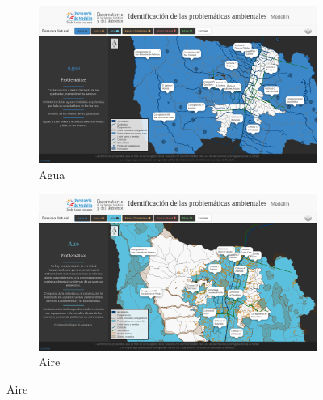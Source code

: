 \documentclass[11pt,letterpaper]{article}
\begin{document}
\begin{figure}[ht!]
\centering
\begin{subfigure}{.49\textwidth}
	\includegraphics[width=\textwidth]{../assets/images/recurso_natural/recurso_agua.png}
	\caption{Agua}\label{fig:rAgua}
\end{subfigure}	
\hfill
\begin{subfigure}{.49\textwidth}
	\includegraphics[width=\textwidth]{../assets/images/recurso_natural/recurso_aire.png}
	\caption{Aire}\label{fig:rAire}
\end{subfigure}


\end{figure}
\end{document}
